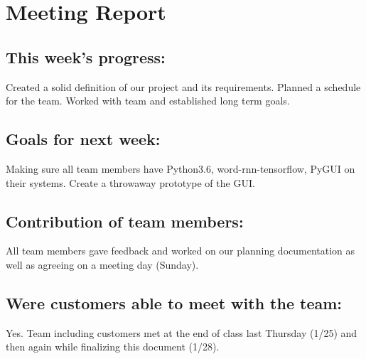 \documentclass[12pt]{article}
\begin{document}
\section{Meeting Report }

\subsection{This week's progress:}
Created a solid definition of our project and its requirements. Planned a schedule for the team. Worked with team and established long term goals.

\subsection{Goals for next week:}
Making sure all team members have Python3.6, word-rnn-tensorflow, PyGUI on their systems.
Create a throwaway prototype of the GUI.

\subsection{Contribution of team members:}
All team members gave feedback and worked on our planning documentation as well as agreeing on a meeting day (Sunday).

\subsection{Were customers able to meet with the team:}
Yes. Team including customers met at the end of class last Thursday (1/25) and then again while finalizing this document (1/28).



\end{document}
